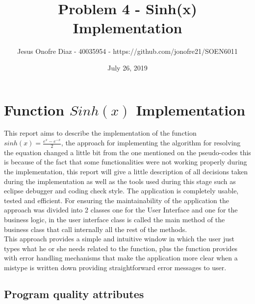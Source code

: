 \documentclass[12pt]{article}
\title{Problem 4 - Sinh(x) Implementation }
\author{Jesus Onofre Diaz - 40035954 -
https://github.com/jonofre21/SOEN6011}
\date{July 26, 2019}
\begin{document}
\maketitle
\section{Function $Sinh(x)$ Implementation}
\noindent This report aims to describe the implementation of the function $sinh(x)= \frac{e^x- e^{-x}}{2}$, the approach for implementing the algorithm for resolving the equation changed a little bit from the one mentioned on the pseudo-codes this is because of the fact that some functionalities were not working properly during the implementation, this report will give a little description of all decisions taken during the implementation as well as the tools used during this stage such as eclipse debugger and coding check style.
The application is completely usable, tested and efficient. For ensuring the maintainability of the application the approach was divided into 2 classes one for the User Interface and one for the business logic, in the user interface class is called the main method of the business class that call internally all the rest of the methods.\\
This approach provides a simple and intuitive window in which the user just types what he or she needs related to the function, plus the function provides with error handling mechanisms that make the application more clear when a mistype is written down providing straightforward error messages to user.  
\noindent
\subsection{Program quality attributes}
\end{document}
